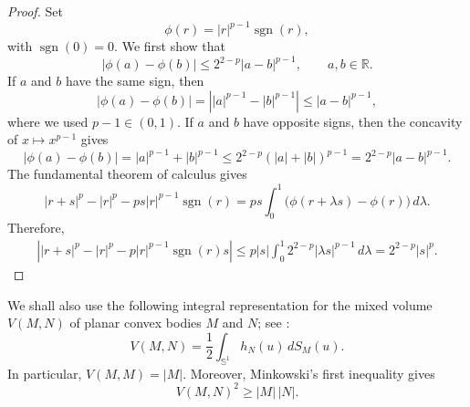 \documentclass[11pt,a4paper]{amsart}
\theoremstyle{plain}
\theoremstyle{definition}
\newcommand{\MainTheoremExtra}{.}
\begin{document}
\begin{proof}
    Set
\[
    \phi(r)=|r|^{p-1}\operatorname{sgn}(r),
\]
with $\operatorname{sgn}(0) = 0$.
We first show that
\[
    |\phi(a)-\phi(b)|
    \leq
    2^{2-p}|a-b|^{p-1},
    \qquad a,b\in\mathbb R.
\]
If \(a\) and \(b\) have the same
sign, then
\[
    |\phi(a)-\phi(b)|=
    \left||a|^{p-1}-|b|^{p-1}\right|
    \leq
    |a-b|^{p-1},
\]
where we used $p-1 \in (0,1).$ If \(a\) and \(b\) have opposite signs, then the concavity of
\(x\mapsto x^{p-1}\) gives
\[
    |\phi(a)-\phi(b)|
    =
    |a|^{p-1}+|b|^{p-1}
    \leq
    2^{2-p}(|a|+|b|)^{p-1}
    =
    2^{2-p}|a-b|^{p-1}.
\]
The fundamental theorem of calculus gives
\[
    |r+s|^p-|r|^p
    -ps|r|^{p-1}\operatorname{sgn}(r)
    =
    ps\int_0^1
    \bigl(\phi(r+\lambda s)-\phi(r)\bigr)\,d\lambda.
\]
Therefore,
\[
\begin{aligned}
    \left|
        |r+s|^p-|r|^p
        -p|r|^{p-1}\operatorname{sgn}(r)s
    \right|\leq
    p|s|\int_0^1
    2^{2-p}|\lambda s|^{p-1}\,d\lambda
   =
    2^{2-p}|s|^p.
\end{aligned}
\]
\end{proof}
We shall also use the following integral representation for the mixed volume $V(M,N)$ of planar convex bodies $M$ and $N$; see \cite[Theorem~5.1.7 and (5.19)]{Schneider-14}:
$$
V(M,N)
=
\frac{1}{2}\int_{\mathbb S^1}
h_N(u)\,dS_M(u).
$$
In particular, $V(M,M)=|M|$. Moreover, Minkowski's first inequality \cite[Theorem~7.2.1]{Schneider-14} gives
$$
V(M,N)^2\geq |M|\,|N|.
$$

    \begingroup
\renewcommand{\MainTheoremExtra}{%
, that is,
        \[
            \left(\frac{\left|A \oplus_p B\right|}{\left|P_{e_2^{\perp}}\left(A \oplus_p B\right)\right|}\right)^p 
            <
            \left(\frac{|A|}{\left|P_{e_2^{\perp}} A\right|}\right)^p+\left(\frac{|B|}{\left|P_{e_2^{\perp}} B\right|}\right)^p.
        \]
}
\RatioLpZonoid*
\endgroup
    
\end{document}
